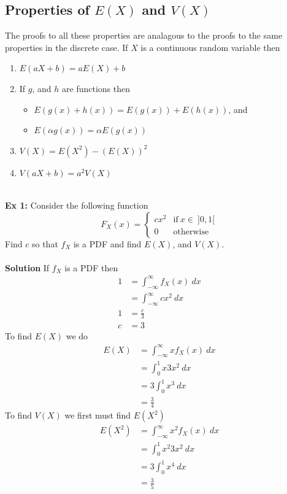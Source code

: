 \documentclass{article}
\begin{document}
\subsection{Properties of $E(X)$ and $V(X)$}
The proofs to all these properties are analagous to the proofs to the same properties in the discrete case. If $X$ is a continuous random variable then
\begin{enumerate}
	\item $E(aX+b) = aE(X) + b$
	\item If $g$, and $h$ are functions then
		\begin{itemize}
			\item $E(g(x) + h(x)) = E(g(x)) + E(h(x))$, and
			\item $E(\alpha g(x)) = \alpha E(g(x))$
		\end{itemize} 
	\item $V(X) = E(X^2) - (E(X))^2$
	\item $V(aX+b) = a^{2}V(X)$
\end{enumerate}
\ \\
\textbf{Ex 1:} Consider the following function
\[
F_{X}(x) =
\begin{cases}
	cx^2 &\text{if}\ x \in\ ]0, 1[\\
	0 &\text{otherwise}
\end{cases}
\]
Find $c$ so that $f_{X}$ is a PDF and find $E(X)$, and $V(X)$.\\\\
\textbf{Solution} If $f_{X}$ is a PDF then
\begin{align*}
	1 &= \int_{-\infty}^{\infty} f_{X}(x)\ dx\\
	 &= \int_{-\infty}^{\infty} cx^2\ dx\\
	1 &= \frac{c}{3}\\
	c &= 3
\end{align*}
To find $E(X)$ we do
\begin{align*}
	E(X) &= \int_{-\infty}^{\infty} xf_{X}(x)\ dx\\
		&= \int_{0}^{1} x3x^{2}\ dx\\
		&= 3\int_{0}^{1} x^{3}\ dx\\
		&= \frac{3}{4}
\end{align*}
To find $V(X)$ we first must find $E(X^2)$
\begin{align*}
	E(X^2) &= \int_{-\infty}^{\infty} x^{2}f_{X}(x)\ dx\\
		&= \int_{0}^{1} x^{2}3x^{2}\ dx\\
		&= 3\int_{0}^{1} x^{4}\ dx\\
		&= \frac{3}{5}
\end{align*}
\end{document}
